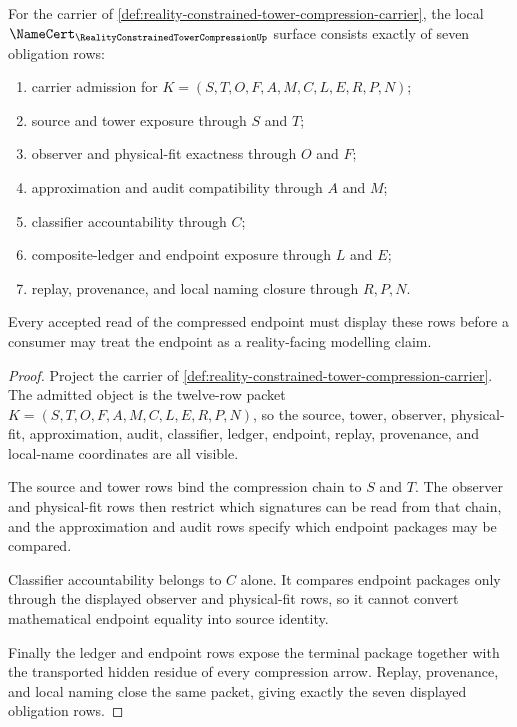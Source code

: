 \begin{theorem}
\label{thm:reality-constrained-tower-compression-namecert-obligations}
For the carrier of \autoref{def:reality-constrained-tower-compression-carrier}, the local $\NameCert_{\RealityConstrainedTowerCompressionUp}$ surface consists exactly of seven obligation rows:
\begin{enumerate}
\item carrier admission for $K=(S,T,O,F,A,M,C,L,E,R,P,N)$;
\item source and tower exposure through $S$ and $T$;
\item observer and physical-fit exactness through $O$ and $F$;
\item approximation and audit compatibility through $A$ and $M$;
\item classifier accountability through $C$;
\item composite-ledger and endpoint exposure through $L$ and $E$;
\item replay, provenance, and local naming closure through $R,P,N$.
\end{enumerate}
Every accepted read of the compressed endpoint must display these rows before a consumer may treat the endpoint as a reality-facing modelling claim.
\end{theorem}
\begin{proof}
Project the carrier of \autoref{def:reality-constrained-tower-compression-carrier}. The admitted object is the twelve-row packet $K=(S,T,O,F,A,M,C,L,E,R,P,N)$, so the source, tower, observer, physical-fit, approximation, audit, classifier, ledger, endpoint, replay, provenance, and local-name coordinates are all visible.

The source and tower rows bind the compression chain to $S$ and $T$. The observer and physical-fit rows then restrict which signatures can be read from that chain, and the approximation and audit rows specify which endpoint packages may be compared.

Classifier accountability belongs to $C$ alone. It compares endpoint packages only through the displayed observer and physical-fit rows, so it cannot convert mathematical endpoint equality into source identity.

Finally the ledger and endpoint rows expose the terminal package together with the transported hidden residue of every compression arrow. Replay, provenance, and local naming close the same packet, giving exactly the seven displayed obligation rows.
\end{proof}

